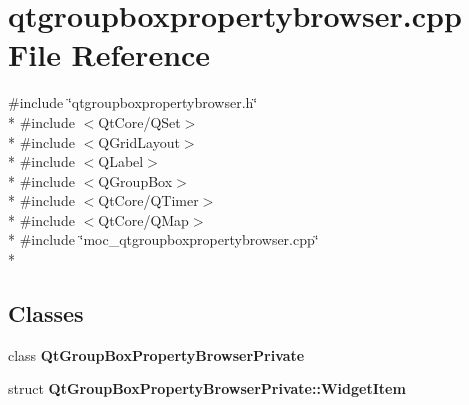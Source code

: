 \section{qtgroupboxpropertybrowser.\+cpp File Reference}
\label{qtgroupboxpropertybrowser_8cpp}
{\ttfamily \#include \char`\"{}qtgroupboxpropertybrowser.\+h\char`\"{}}\\*
{\ttfamily \#include $<$Qt\+Core/\+Q\+Set$>$}\\*
{\ttfamily \#include $<$Q\+Grid\+Layout$>$}\\*
{\ttfamily \#include $<$Q\+Label$>$}\\*
{\ttfamily \#include $<$Q\+Group\+Box$>$}\\*
{\ttfamily \#include $<$Qt\+Core/\+Q\+Timer$>$}\\*
{\ttfamily \#include $<$Qt\+Core/\+Q\+Map$>$}\\*
{\ttfamily \#include \char`\"{}moc\+\_\+qtgroupboxpropertybrowser.\+cpp\char`\"{}}\\*
\subsection*{Classes}
\begin{DoxyCompactItemize}
\item 
class {\bf Qt\+Group\+Box\+Property\+Browser\+Private}
\item 
struct {\bf Qt\+Group\+Box\+Property\+Browser\+Private\+::\+Widget\+Item}
\end{DoxyCompactItemize}
